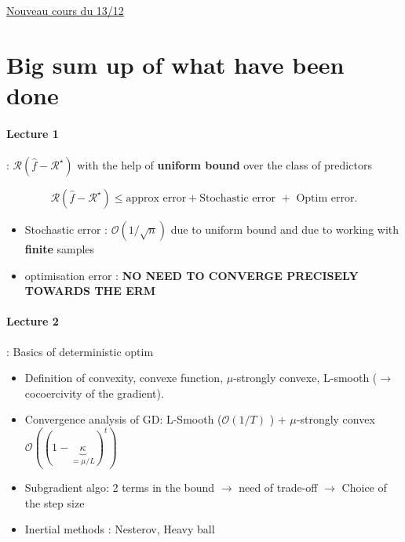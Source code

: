 \underline{Nouveau cours du 13/12} \\

\section{Big sum up of what have been done }

\paragraph{Lecture 1}: $ \mathcal{R}(\hat{f} - \mathcal{R}^\star ) $ with the help of \textbf{uniform bound} over the class of predictors

\[
    \mathcal{R}(\hat{f} - \mathcal{R}^\star ) \leq \text{approx error} + \text{Stochastic error } + \text{ Optim error}
.\]
\begin{itemize}
    \item Stochastic error : $ \mathcal{O}(1 / \sqrt{n}) $ due to uniform bound and due to working with \textbf{finite} samples
    \item optimisation error : \textbf{NO NEED TO CONVERGE PRECISELY TOWARDS THE ERM} 
\end{itemize}

\paragraph{Lecture 2}: Basics of deterministic optim 
\begin{itemize}
    \item Definition of convexity, convexe function, $ \mu$-strongly convexe, L-smooth ($\rightarrow$ cocoercivity of the gradient).
    \item Convergence analysis of GD: L-Smooth ($ \mathcal{O}(1/T) $ ) + $ \mu  $-strongly convex $ \mathcal{O}((1 - \underbrace{\kappa }_{= \mu / L })^t) $  
    \item Subgradient algo: 2 terms in the bound $\rightarrow$ need of trade-off $\rightarrow$ Choice of the step size 
    \item Inertial methods : Nesterov, Heavy ball
\end{itemize}

